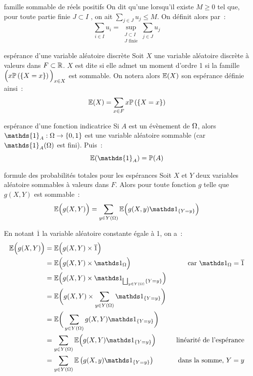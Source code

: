 \begin{definition}{}{famille sommable de réels positifs}
    On dit qu’une  lorsqu’il existe $M\geq 0$ tel que, pour toute partie finie $J \subset I$ , on ait $\sum_{j \in J}u_j \leq M$.
    On définit alors  par~:
    $$\sum_{i \in I}u_i = \sup_{\substack{J \subset I \\ J\text{ finie}}} \sum_{j \in J} u_j$$
\end{definition}

\begin{definition}{}{espérance d'une variable aléatoire discrète}
    Soit $X$ une variable aléatoire discrète à valeurs dans $F \subset \mathbb{R}$.
    $X$ est dite  si elle admet un moment d'ordre 1 \ie si la famille $\Big(x\mathbb{P}\left(\left\{X = x\right\}\right)\Big)_{x \in X}$ est sommable. On notera alors $\mathbb{E}(X)$ son espérance définie ainsi~:
    $$\mathbb{E}(X) = \sum_{x \in F} x\mathbb{P}\left(\left\{X = x\right\}\right)$$
\end{definition}

\begin{exemple}{}{espérance d'une fonction indicatrice}
    Si $A$ est un évènement de $\Omega$, alors $\mathds{1}_A : \univ \to \{0, 1\}$ est une variable aléatoire sommable (car $\mathds{1}_A(\univ)$ est fini). Puis~:
    $$\mb{E}(\mathds{1}_A) = \proba(A)$$
\end{exemple}

\begin{theoreme}{}{formule des probabilités totales pour les espérances}
    Soit $X$ et $Y$ deux variables aléatoire sommables à valeurs dans $F$. Alors pour toute fonction $g$ telle que $g(X,Y)$ est sommable~:
    $$\mb{E}\Big(g(X,Y)\Big) = \sum_{y \in Y(\univ)} \mb{E}\Big(g(X,y)\indicatrice_{\{Y=y\}}\Big)$$
\end{theoreme}

\begin{demonstration}
    En notant $\overline{1}$ la variable aléatoire constante égale à 1, on a~:
    \begin{align*}
        \esperanceBig{g(X,Y)} &= \esperanceBig{g(X,Y)\times \overline{1}}\\
        &= \esperanceBig{g(X,Y)\times\indicatrice_\univ} \qquad&\text{car } \indicatrice_\univ = \overline{1}\\
        &= \esperanceBig{\displaystyle g(X,Y)\times \indicatrice_{\bigsqcup_{y \in Y(\univ)}\{Y = y\}}}\\
        &= \esperancebigg{\displaystyle g(X,Y)\times \sum_{y \in Y(\univ)} \indicatrice_{\{Y = y\}}}\\
        &= \esperancebigg{\sum_{y \in Y(\univ)}g(X,Y)\indicatrice_{\{Y=y\}}}\\
        &= \sum_{y \in Y(\univ)} \mb{E}\Big(g(X,Y)\indicatrice_{\{Y=y\}}\Big) \qquad&\text{linéarité de l'espérance}\\
        &= \sum_{y \in Y(\univ)}\esperance{g(X,y)\indicatrice_{\{Y=y\}}} \qquad&\text{dans la somme, }Y=y\\
    \end{align*}
\end{demonstration}


